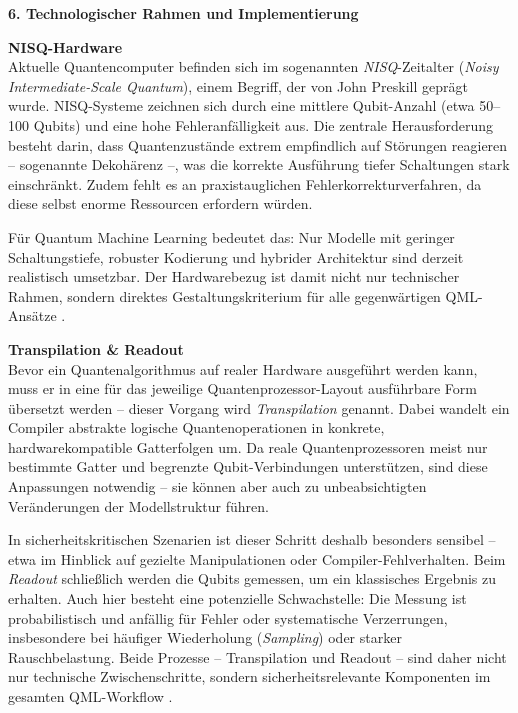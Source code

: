 \vspace{0.4cm}
\noindent\textbf{6. Technologischer Rahmen und Implementierung}  

\vspace{0.2cm}
\noindent
\textbf{NISQ-Hardware}\\
Aktuelle Quantencomputer befinden sich im sogenannten \textit{NISQ}-Zeitalter (\textit{Noisy Intermediate-Scale Quantum}), einem Begriff, der von John Preskill geprägt wurde. NISQ-Systeme zeichnen sich durch eine mittlere Qubit-Anzahl (etwa 50–100 Qubits) und eine hohe Fehleranfälligkeit aus. Die zentrale Herausforderung besteht darin, dass Quantenzustände extrem empfindlich auf Störungen reagieren – sogenannte Dekohärenz –, was die korrekte Ausführung tiefer Schaltungen stark einschränkt. Zudem fehlt es an praxistauglichen Fehlerkorrekturverfahren, da diese selbst enorme Ressourcen erfordern würden.  

Für Quantum Machine Learning bedeutet das: Nur Modelle mit geringer Schaltungstiefe, robuster Kodierung und hybrider Architektur sind derzeit realistisch umsetzbar. Der Hardwarebezug ist damit nicht nur technischer Rahmen, sondern direktes Gestaltungskriterium für alle gegenwärtigen QML-Ansätze \cite{preskill2018}.

\vspace{0.2cm}
\noindent
\textbf{Transpilation \& Readout}\\
Bevor ein Quantenalgorithmus auf realer Hardware ausgeführt werden kann, muss er in eine für das jeweilige Quantenprozessor-Layout ausführbare Form übersetzt werden – dieser Vorgang wird \textit{Transpilation} genannt. Dabei wandelt ein Compiler abstrakte logische Quantenoperationen in konkrete, hardwarekompatible Gatterfolgen um. Da reale Quantenprozessoren meist nur bestimmte Gatter und begrenzte Qubit-Verbindungen unterstützen, sind diese Anpassungen notwendig – sie können aber auch zu unbeabsichtigten Veränderungen der Modellstruktur führen.

In sicherheitskritischen Szenarien ist dieser Schritt deshalb besonders sensibel – etwa im Hinblick auf gezielte Manipulationen oder Compiler-Fehlverhalten. Beim \textit{Readout} schließlich werden die Qubits gemessen, um ein klassisches Ergebnis zu erhalten. Auch hier besteht eine potenzielle Schwachstelle: Die Messung ist probabilistisch und anfällig für Fehler oder systematische Verzerrungen, insbesondere bei häufiger Wiederholung (\textit{Sampling}) oder starker Rauschbelastung. Beide Prozesse – Transpilation und Readout – sind daher nicht nur technische Zwischenschritte, sondern sicherheitsrelevante Komponenten im gesamten QML-Workflow \cite{wille2019}.

